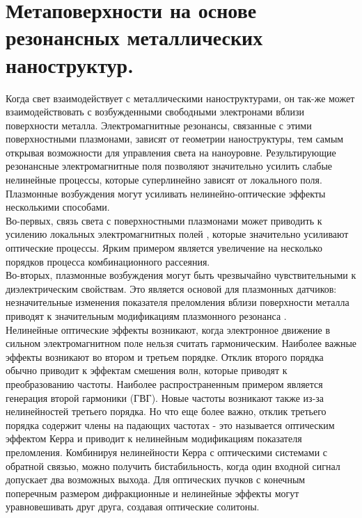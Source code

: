 \section{Метаповерхности на основе резонансных металлических наноструктур.}
\hspace*{2mm}
Когда свет взаимодействует с металлическими наноструктурами, он  так-же может взаимодействовать с возбужденными свободными электронами вблизи поверхности металла. Электромагнитные резонансы, связанные с этими поверхностными плазмонами, зависят от геометрии наноструктуры, тем самым открывая  возможности для управления света на наноуровне. Результирующие резонансные электромагнитные поля позволяют значительно усилить слабые нелинейные процессы, которые суперлинейно зависят от локального поля.
\\
\hspace*{2mm}
Плазмонные возбуждения могут усиливать нелинейно-оптические эффекты несколькими способами. 
\\
Во-первых, связь света с поверхностными плазмонами может приводить к усилению локальных электромагнитных полей \cite{novotny2011antennas}, которые значительно усиливают оптические процессы. Ярким примером является увеличение на несколько порядков процесса  комбинационного рассеяния.
\\
Во-вторых, плазмонные возбуждения могут быть чрезвычайно чувствительными к диэлектрическим свойствам. Это является основой для плазмонных датчиков: незначительные изменения показателя преломления вблизи поверхности металла приводят к значительным модификациям плазмонного резонанса \cite{homola2008surface}.
\\
\hspace*{2mm}
Нелинейные оптические эффекты возникают, когда электронное движение в сильном электромагнитном поле нельзя считать гармоническим. Наиболее важные эффекты возникают во втором и третьем порядке. Отклик второго порядка обычно приводит к эффектам смешения волн, которые приводят к преобразованию частоты. Наиболее распространенным примером является генерация второй гармоники (ГВГ). Новые частоты возникают также из-за нелинейностей третьего порядка. Но что еще более важно, отклик третьего порядка содержит члены на падающих частотах - это называется оптическим эффектом Керра и приводит к нелинейным модификациям показателя преломления. Комбинируя нелинейности Керра с оптическими системами с обратной связью, можно получить бистабильность, когда один входной сигнал допускает два возможных выхода. Для оптических пучков с конечным поперечным размером дифракционные и нелинейные эффекты могут уравновешивать друг друга, создавая оптические солитоны.
